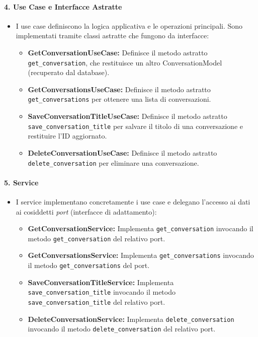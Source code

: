     \paragraph{4. Use Case e Interfacce Astratte}
    \begin{itemize}
        \item I use case definiscono la logica applicativa e le operazioni principali. Sono implementati tramite classi astratte che fungono da interfacce:
        \begin{itemize}
            \item \textbf{GetConversationUseCase:} Definisce il metodo astratto \texttt{get\_conversation}, che restituisce un altro ConversationModel (recuperato dal database).
            \item \textbf{GetConversationsUseCase:} Definisce il metodo astratto \texttt{get\_conversations} per ottenere una lista di conversazioni.
            \item \textbf{SaveConversationTitleUseCase:} Definisce il metodo astratto \texttt{save\_conversation\_title} per salvare il titolo di una conversazione e restituire l'ID aggiornato.
            \item \textbf{DeleteConversationUseCase:} Definisce il metodo astratto \texttt{delete\_conversation} per eliminare una conversazione.
        \end{itemize}
    \end{itemize}

    \paragraph{5. Service}
    \begin{itemize}
        \item I service implementano concretamente i use case e delegano l'accesso ai dati ai cosiddetti \textit{port} (interfacce di adattamento):
        \begin{itemize}
            \item \textbf{GetConversationService:} Implementa \texttt{get\_conversation} invocando il metodo \texttt{get\_conversation} del relativo port.
            \item \textbf{GetConversationsService:} Implementa \texttt{get\_conversations} invocando il metodo \texttt{get\_conversations} del port.
            \item \textbf{SaveConversationTitleService:} Implementa \texttt{save\_conversation\_title} invocando il metodo \texttt{save\_conversation\_title} del relativo port.
            \item \textbf{DeleteConversationService:} Implementa \texttt{delete\_conversation} invocando il metodo \texttt{delete\_conversation} del relativo port.
        \end{itemize}
    \end{itemize}

